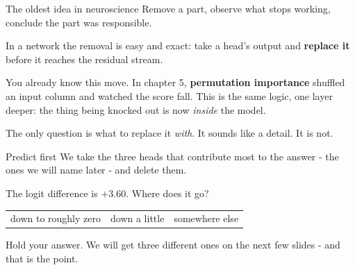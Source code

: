 \documentclass[aspectratio=169]{beamer}
\newcommand{\keybox}[1]{%
  \begin{tcolorbox}[colback=armblue!8, colframe=armblue, boxrule=0.6pt, arc=2pt]
  #1
  \end{tcolorbox}}
\begin{document}
\begin{frame}{The oldest idea in neuroscience}
  \vspace{0.7em}
  Remove a part, observe what stops working, conclude the part was responsible.

  \vspace{0.8em}
  In a network the removal is easy and exact: take a head's output and \textbf{replace it}
  before it reaches the residual stream.

  \vspace{0.9em}
  \keybox{You already know this move. In chapter 5, \textbf{permutation importance} shuffled an
  input column and watched the score fall. This is the same logic, one layer deeper: the thing
  being knocked out is now \emph{inside} the model.}

  \vspace{0.9em}
  The only question is what to replace it \emph{with}. It sounds like a detail. It is not.
\end{frame}

\begin{frame}{Predict first}
  \vspace{1.0em}
  We take the three heads that contribute most to the answer - the ones we will name later - and
  delete them.

  \vspace{1.3em}
  \begin{center}
    {\large The logit difference is $+3.60$. Where does it go?}
  \end{center}

  \vspace{1.3em}
  \begin{center}
  \small
  \begin{tabular}{@{}ccc@{}}
    down to roughly zero & down a little & somewhere else\\
  \end{tabular}
  \end{center}

  \vspace{1.2em}
  \begin{center}
    {\footnotesize Hold your answer. We will get three different ones on the next few slides -
    and that is the point.}
  \end{center}
\end{frame}
\end{document}
